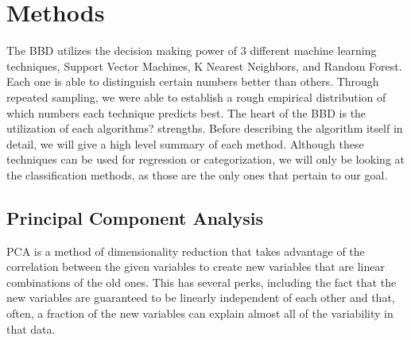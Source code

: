 \documentclass[11pt, oneside]{article}   	%
\begin{document}
\section{Methods}
The BBD utilizes the decision making power of 3 different machine learning techniques, Support Vector Machines, K Nearest Neighbors, and Random Forest. Each one is able to distinguish certain numbers better than others. Through repeated sampling, we were able to establish a rough empirical distribution of which numbers each technique predicts best. The heart of the BBD is the utilization of each algorithms? strengths. Before describing the algorithm itself in detail, we will give a high level summary of each method. Although these techniques can be used for regression or categorization, we will only be looking at the classification methods, as those are the only ones that pertain to our goal.

\subsection{Principal Component Analysis}
PCA is a method of dimensionality reduction that takes advantage of the correlation between the given variables to create new variables that are linear combinations of the old ones. This has several perks, including the fact that the new variables are guaranteed to be linearly independent of each other and that, often, a fraction of the new variables can explain almost all of the variability in that data. \cite{PCABook}
\end{document}
